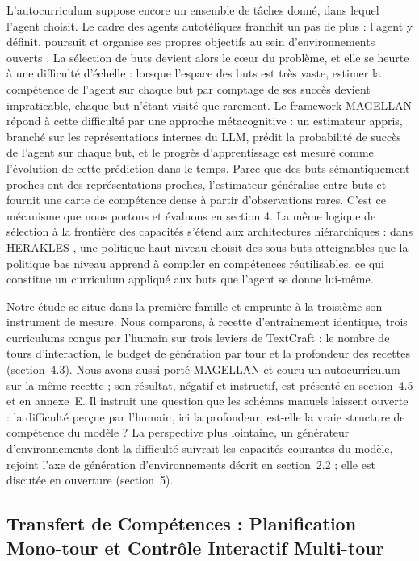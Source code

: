 \documentclass[11pt,a4paper]{article}
\begin{document}
L'autocurriculum suppose encore un ensemble de tâches donné, dans lequel l'agent choisit. Le cadre des agents autotéliques franchit un pas de plus : l'agent y définit, poursuit et organise ses propres objectifs au sein d'environnements ouverts \cite{colas2022autotelic, forestier2017imgep}. La sélection de buts devient alors le cœur du problème, et elle se heurte à une difficulté d'échelle : lorsque l'espace des buts est très vaste, estimer la compétence de l'agent sur chaque but par comptage de ses succès devient impraticable, chaque but n'étant visité que rarement. Le framework MAGELLAN \cite{gaven2025magellan} répond à cette difficulté par une approche métacognitive : un estimateur appris, branché sur les représentations internes du LLM, prédit la probabilité de succès de l'agent sur chaque but, et le progrès d'apprentissage est mesuré comme l'évolution de cette prédiction dans le temps. Parce que des buts sémantiquement proches ont des représentations proches, l'estimateur généralise entre buts et fournit une carte de compétence dense à partir d'observations rares. C'est ce mécanisme que nous portons et évaluons en section 4. La même logique de sélection à la frontière des capacités s'étend aux architectures hiérarchiques : dans HERAKLES \cite{carta2025herakles}, une politique haut niveau choisit des sous-buts atteignables que la politique bas niveau apprend à compiler en compétences réutilisables, ce qui constitue un curriculum appliqué aux buts que l'agent se donne lui-même.

Notre étude se situe dans la première famille et emprunte à la troisième son instrument de mesure. Nous comparons, à recette d'entraînement identique, trois curriculums conçus par l'humain sur trois leviers de TextCraft : le nombre de tours d'interaction, le budget de génération par tour et la profondeur des recettes (section~4.3). Nous avons aussi porté MAGELLAN et couru un autocurriculum sur la même recette ; son résultat, négatif et instructif, est présenté en section~4.5 et en annexe~E. Il instruit une question que les schémas manuels laissent ouverte : la difficulté perçue par l'humain, ici la profondeur, est-elle la vraie structure de compétence du modèle ? La perspective plus lointaine, un générateur d'environnements dont la difficulté suivrait les capacités courantes du modèle, rejoint l'axe de génération d'environnements décrit en section~2.2 ; elle est discutée en ouverture (section~5).


\subsection{Transfert de Compétences : Planification Mono-tour et Contrôle Interactif Multi-tour}
\end{document}
